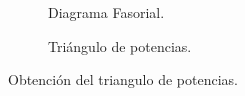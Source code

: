                \begin{figure}[H]
                  \centering
                     \begin{subfigure}[b]{0.4\textwidth}
                        \centering
                        \caption{Diagrama Fasorial.}
                        \label{fig:DiagFasor}
                  \end{subfigure}
                  \hfill
                  \begin{subfigure}[b]{0.5\textwidth}
                        \centering
                        \caption{Triángulo de potencias.}
                        \label{fig:TriangPot}
                  \end{subfigure}
                  \hfill
                  \caption{Obtención del triangulo de potencias.}
                  \label{fig:ObtDeTriagDePot}
               \end{figure}
          
